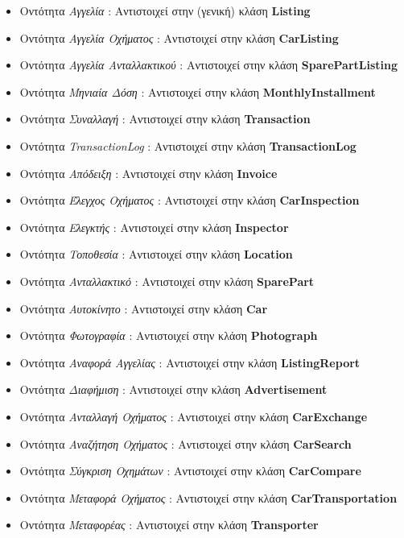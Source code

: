 \documentclass{../ol-softwaremanual}
\begin{document}
	\begin{itemize}
		\item Οντότητα \textit{Αγγελία} : Αντιστοιχεί στην (γενική) κλάση \en \textbf{Listing}\gr
		\item Οντότητα \textit{Αγγελία Οχήματος} : Αντιστοιχεί στην κλάση \en \textbf{CarListing}\gr
		\item Οντότητα \textit{Αγγελία Ανταλλακτικού} : Αντιστοιχεί στην κλάση \en \textbf{SparePartListing}\gr
		\item Οντότητα \textit{Μηνιαία Δόση} : Αντιστοιχεί στην κλάση \en\textbf{MonthlyInstallment}\gr
		\item Οντότητα \textit{Συναλλαγή} : Αντιστοιχεί στην κλάση \en \textbf{Transaction}\gr
		\item Οντότητα \en \textit{TransactionLog} \gr : Αντιστοιχεί στην κλάση \en \textbf{TransactionLog}\gr
		\item Οντότητα \textit{Απόδειξη} : Αντιστοιχεί στην κλάση \en \textbf{Invoice}\gr
		\item Οντότητα \textit{Έλεγχος Οχήματος} : Αντιστοιχεί στην κλάση \en \textbf{CarInspection}\gr
		\item Οντότητα \textit{Ελεγκτής} : Αντιστοιχεί στην κλάση \en \textbf{Inspector}\gr
		\item Οντότητα \textit{Τοποθεσία} : Αντιστοιχεί στην κλάση \en \textbf{Location}\gr
		\item Οντότητα \textit{Ανταλλακτικό} : Αντιστοιχεί στην κλάση \en \textbf{SparePart}\gr
		\item Οντότητα \textit{Αυτοκίνητο} : Αντιστοιχεί στην κλάση \en \textbf{Car}\gr
		\item Οντότητα \textit{Φωτογραφία} : Αντιστοιχεί στην κλάση \en \textbf{Photograph}\gr
		\item Οντότητα \textit{Αναφορά Αγγελίας} : Αντιστοιχεί στην κλάση \en \textbf{ListingReport}\gr
		\item Οντότητα \textit{Διαφήμιση} : Αντιστοιχεί στην κλάση \en \textbf{Advertisement}\gr
		\item Οντότητα \textit{Ανταλλαγή Οχήματος} : Αντιστοιχεί στην κλάση \en \textbf{CarExchange}\gr
		\item Οντότητα \textit{Αναζήτηση Οχήματος} : Αντιστοιχεί στην κλάση \en \textbf{CarSearch}\gr
		\item Οντότητα \textit{Σύγκριση Οχημάτων} : Αντιστοιχεί στην κλάση \en \textbf{CarCompare}\gr
		\item Οντότητα \textit{Μεταφορά Οχήματος} : Αντιστοιχεί στην κλάση \en \textbf{CarTransportation}\gr
		\item Οντότητα \textit{Μεταφορέας} : Αντιστοιχεί στην κλάση \en \textbf{Transporter}\gr

\end{itemize}
\end{document}
